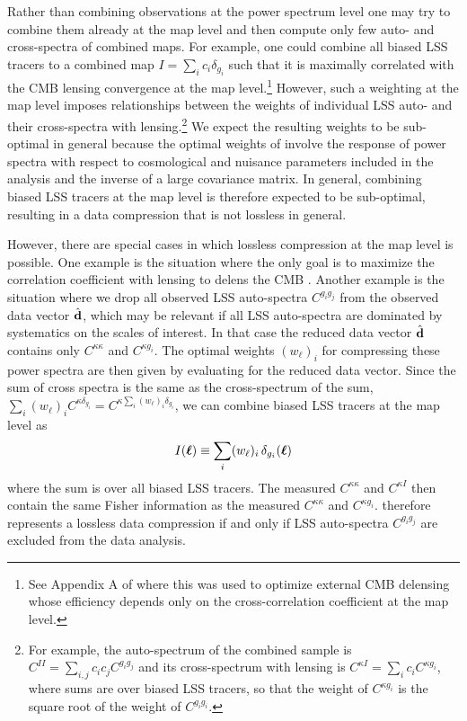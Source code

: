\documentclass[prd,superscriptaddress,floatfix,notitlepage,nofootinbib,reprint]{revtex4-1} %
\begin{document}
Rather than combining observations at the power spectrum level one may try to combine them already at the map level and then compute only few auto- and cross-spectra of combined maps.
For example, one could combine all biased LSS tracers to a combined map $I=\sum_i c_i \delta_{g_i}$ such that  it is maximally correlated with the CMB lensing convergence at the map level.\footnote{See Appendix A of \cite{BlakeMarcel1502} where this was used to optimize external CMB delensing whose efficiency depends only on the cross-correlation coefficient at the map level.}
However, such a weighting at the map level imposes relationships between the weights of individual LSS auto- and their cross-spectra with lensing.\footnote{For example, the auto-spectrum of the combined sample is
$C^{II} = \sum_{i,j}c_ic_jC^{g_ig_j}$
and its cross-spectrum with lensing is
$C^{\kappa I} = \sum_{i}c_iC^{\kappa g_i}$, 
where sums are over biased LSS tracers, so that the weight of $C^{\kappa g_i}$ is the square root of the weight of $C^{g_ig_i}$.}
We expect the resulting weights to be sub-optimal in general because the optimal weights of  involve the response of power spectra with respect to cosmological and nuisance parameters included in the analysis and the inverse of a large covariance matrix. 
In general, combining biased LSS tracers at the map level is therefore expected to be sub-optimal, resulting in a data compression that is not lossless in general.

However, there are special cases in which lossless compression at the map level is possible.
One example is the situation where the only goal is to maximize the correlation coefficient with lensing to delens the CMB \cite{BlakeMarcel1502}.
Another example is the situation where we drop all observed LSS auto-spectra $C^{g_ig_j}$ from the observed data vector $\hat{\textbf{d}}$, which may be relevant if all LSS auto-spectra are dominated by systematics on the scales of interest.
In that case the reduced data vector $\hat{\textbf{d}}$ contains only $C^{\kappa\kappa}$ and $C^{\kappa g_i}$. 
The optimal weights $(w_\ell)_i$ for compressing these power spectra are then given by evaluating  for the reduced data vector.
Since the sum of cross spectra is the same as the cross-spectrum of the sum, $\sum_i (w_\ell)_iC^{\kappa \delta_{g_i}}=C^{\kappa\sum_i(w_\ell)_i\delta_{g_i}}$, we can combine biased LSS tracers at the map level as
\begin{align}
  \label{eq:MapCompression}
I({\boldsymbol \ell}) \equiv \sum_i (w_\ell)_i \,\delta_{g_i}({\boldsymbol \ell})
\end{align}
where the sum is over all biased LSS tracers.
The measured $C^{\kappa\kappa}$ and $C^{\kappa I}$ then contain the same Fisher information as the measured $C^{\kappa\kappa}$ and $C^{\kappa g_i}$.
 therefore represents a lossless data compression if and only if LSS auto-spectra $C^{g_ig_j}$ are excluded from the data analysis.




\label{lastpage}
\end{document}
